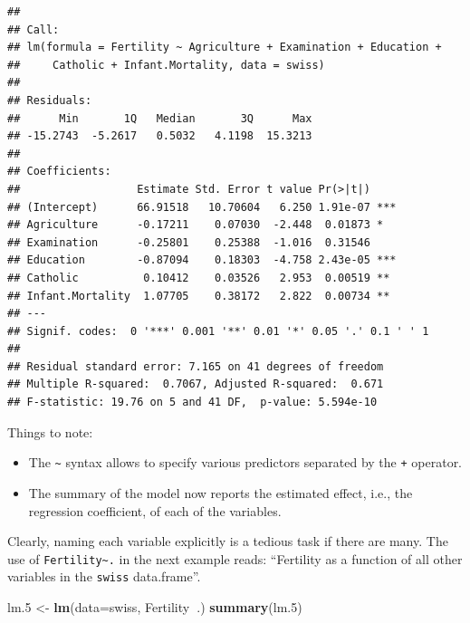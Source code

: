 \documentclass[]{book}
\newenvironment{Shaded}{\begin{snugshade}}{\end{snugshade}}
\newcommand{\DataTypeTok}[1]{\textcolor[rgb]{0.13,0.29,0.53}{#1}}
\newcommand{\FloatTok}[1]{\textcolor[rgb]{0.00,0.00,0.81}{#1}}
\newcommand{\KeywordTok}[1]{\textcolor[rgb]{0.13,0.29,0.53}{\textbf{#1}}}
\newcommand{\NormalTok}[1]{#1}
\newcommand{\OperatorTok}[1]{\textcolor[rgb]{0.81,0.36,0.00}{\textbf{#1}}}
\newcommand{\StringTok}[1]{\textcolor[rgb]{0.31,0.60,0.02}{#1}}
\providecommand{\tightlist}{%
  \setlength{\itemsep}{0pt}\setlength{\parskip}{0pt}}
\theoremstyle{definition}
\theoremstyle{definition}
\theoremstyle{definition}
\theoremstyle{remark}
\begin{document}
\begin{verbatim}
## 
## Call:
## lm(formula = Fertility ~ Agriculture + Examination + Education + 
##     Catholic + Infant.Mortality, data = swiss)
## 
## Residuals:
##      Min       1Q   Median       3Q      Max 
## -15.2743  -5.2617   0.5032   4.1198  15.3213 
## 
## Coefficients:
##                  Estimate Std. Error t value Pr(>|t|)    
## (Intercept)      66.91518   10.70604   6.250 1.91e-07 ***
## Agriculture      -0.17211    0.07030  -2.448  0.01873 *  
## Examination      -0.25801    0.25388  -1.016  0.31546    
## Education        -0.87094    0.18303  -4.758 2.43e-05 ***
## Catholic          0.10412    0.03526   2.953  0.00519 ** 
## Infant.Mortality  1.07705    0.38172   2.822  0.00734 ** 
## ---
## Signif. codes:  0 '***' 0.001 '**' 0.01 '*' 0.05 '.' 0.1 ' ' 1
## 
## Residual standard error: 7.165 on 41 degrees of freedom
## Multiple R-squared:  0.7067, Adjusted R-squared:  0.671 
## F-statistic: 19.76 on 5 and 41 DF,  p-value: 5.594e-10
\end{verbatim}

Things to note:

\begin{itemize}
\tightlist
\item
  The \texttt{\textasciitilde{}} syntax allows to specify various predictors separated by the \texttt{+} operator.
\item
  The summary of the model now reports the estimated effect, i.e., the regression coefficient, of each of the variables.
\end{itemize}

Clearly, naming each variable explicitly is a tedious task if there are many. The use of \texttt{Fertility\textasciitilde{}.} in the next example reads: ``Fertility as a function of all other variables in the \texttt{swiss} data.frame''.

\begin{Shaded}
\begin{Highlighting}[]
\NormalTok{lm}\FloatTok{.5}\NormalTok{ <-}\StringTok{ }\KeywordTok{lm}\NormalTok{(}\DataTypeTok{data=}\NormalTok{swiss, Fertility}\OperatorTok{~}\NormalTok{.)}
\KeywordTok{summary}\NormalTok{(lm}\FloatTok{.5}\NormalTok{)}
\end{Highlighting}
\end{Shaded}
\end{document}
